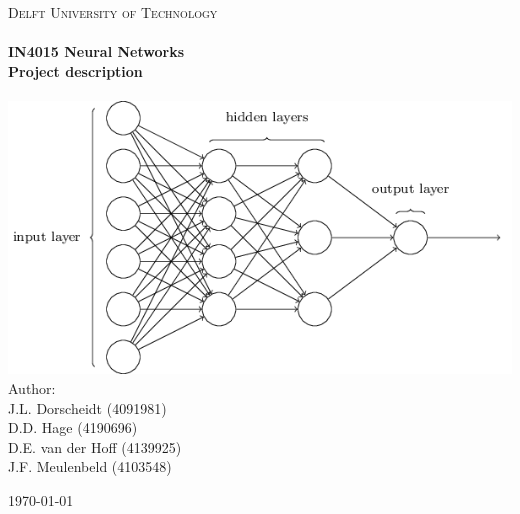 \begin{titlepage}
\begin{center}

\textsc{\LARGE Delft University of Technology}\\[0.8cm]


\HRule \\[0.4cm]
{\Large \bfseries IN4015 Neural Networks}\\[0.2cm]
{\large \bfseries  Project description}\\[0.2cm]
\HRule \\[0.9cm]

\includegraphics[scale=0.7]{./Titlepage/cover}\\[0.5cm]

\large
Author:\\
J.L. Dorscheidt (4091981)\\
D.D. Hage (4190696)\\
D.E. van der Hoff (4139925)\\
J.F. Meulenbeld (4103548)\\



\vfill

\begin{large}\today \end{large}

\end{center}
\end{titlepage}